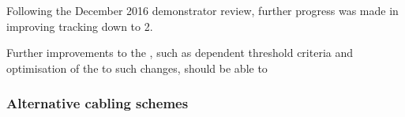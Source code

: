 Following the December 2016 demonstrator review, further progress was made in improving tracking down to 2\GeV.


Further improvements to the \HT, such as \pt dependent threshold criteria and optimisation of the \KF to such changes, should be able to 

\subsubsection{Alternative cabling schemes}
